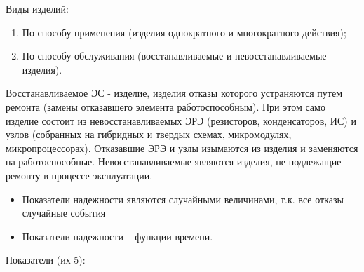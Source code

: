 \documentclass[unicode, 12pt, a4paper, oneside]{article}
\begin{document}
Виды изделий:
	\begin{enumerate}
	\item По способу применения (изделия однократного и многократного действия);
\item	По способу обслуживания (восстанавливаемые и невосстанавливаемые изделия).
	\end{enumerate}
Восстанавливаемое ЭС -  изделие, изделия отказы которого устраняются путем ремонта (замены отказавшего элемента работоспособным). При этом само изделие состоит из невосстанавливаемых ЭРЭ (резисторов, конденсаторов, ИС) и узлов (собранных на гибридных и твердых схемах, микромодулях, микропроцессорах). Отказавшие ЭРЭ и узлы изымаются из изделия и заменяются на работоспособные.
Невосстанавливаемые являются изделия, не подлежащие ремонту в процессе эксплуатации.
\begin{itemize}
\item 	Показатели надежности  являются случайными величинами, т.к. все отказы случайные события
\item	Показатели надежности – функции времени.
	\end{itemize}
Показатели (их 5):
\end{document}
